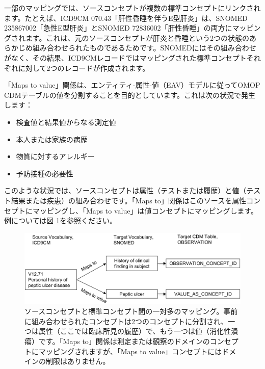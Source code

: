 \documentclass[
  11pt]{book}
\providecommand{\tightlist}{%
  \setlength{\itemsep}{0pt}\setlength{\parskip}{0pt}}
\theoremstyle{definition}
\theoremstyle{definition}
\theoremstyle{definition}
\theoremstyle{definition}
\theoremstyle{remark}
\begin{document}
一部のマッピングでは、ソースコンセプトが複数の標準コンセプトにリンクされます。たとえば、ICD9CM 070.43「肝性昏睡を伴うE型肝炎」は、SNOMED 235867002「急性E型肝炎」とSNOMED 72836002「肝性昏睡」の両方にマッピングされます。これは、元のソースコンセプトが肝炎と昏睡という2つの状態のあらかじめ組み合わせられたものであるためです。SNOMEDにはその組み合わせがなく、その結果、ICD9CMレコードではマッピングされた標準コンセプトそれぞれに対して2つのレコードが作成されます。

「Maps to value」関係は、エンティティ-属性-値（EAV）モデルに従ってOMOP CDMテーブルの値を分割することを目的としています。これは次の状況で発生します：

\begin{itemize}
\tightlist
\item
  検査値と結果値からなる測定値
\item
  本人または家族の病歴
\item
  物質に対するアレルギー
\item
  予防接種の必要性
\end{itemize}

このような状況では、ソースコンセプトは属性（テストまたは履歴）と値（テスト結果または疾患）の組み合わせです。「Maps to」関係はこのソースを属性コンセプトにマッピングし、「Maps to value」は値コンセプトにマッピングします。例については図 \ref{fig:conceptValue}を参照ください。

\begin{figure}

{\centering \includegraphics[width=1\linewidth]{images/StandardizedVocabularies/conceptValue} 

}

\caption{ソースコンセプトと標準コンセプト間の一対多のマッピング。事前に組み合わせられたコンセプトは2つのコンセプトに分割され、一つは属性（ここでは臨床所見の履歴）で、もう一つは値（消化性潰瘍）です。「Maps to」関係は測定または観察のドメインのコンセプトにマッピングされますが、「Maps to value」コンセプトにはドメインの制限はありません。}\label{fig:conceptValue}
\end{figure}
\end{document}
